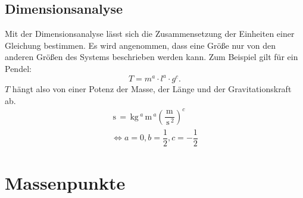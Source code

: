 \documentclass[a4paper,12pt]{article}
\begin{document}
\subsection{Dimensionsanalyse}
Mit der Dimensionsanalyse lässt sich die Zusammensetzung der Einheiten einer Gleichung bestimmen. Es wird angenommen, dass eine Größe nur von den anderen Größen des Systems beschrieben werden kann. Zum Beispiel gilt für ein Pendel:
\[ 
        T=m ^{a}\cdot l^{a}\cdot g^{c}
.\] 
$T$ hängt also von einer Potenz der Masse, der Länge und der Gravitationskraft ab.
\begin{gather*}
        \,\text{s}\,=\,\text{kg}\,^{a}\,\text{m}\, ^{a}\left(\dfrac{\,\text{m}\,}{\,\text{s}\, ^2}\right)^{c}\\
        \Leftrightarrow a=0,b=\dfrac{1}{2},c=-\dfrac{1}{2}
\end{gather*}

\section{Massenpunkte}
\end{document}
